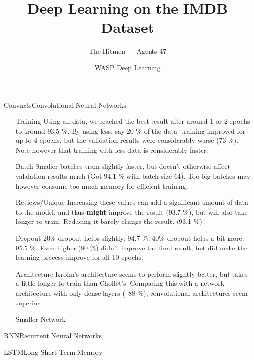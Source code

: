 \documentclass{beamer}
\title{Deep Learning on the IMDB Dataset}
\date{WASP Deep Learning}
\author[Agents 47]{The Hitmen --- Agents 47}
\begin{document}
\begin{frame}
  \titlepage
\end{frame}


\begin{frame}{Convnets}{Convolutional Neural Networks}

\begin{itemize}

\item[Training] Using all data, we reached the best result after around 1 or 2
  epochs to around 93.5 \%. By using less, say 20 \% of the data, training
  improved for up to 4 epochs, but the validation results were considerably
  worse (73 \%). Note however that training with less data is considerably
  faster.
  
\item[Batch] Smaller batches train slightly faster, but doesn't otherwise
  affect validation results much (Got 94.1 \% with batch size 64). Too big
  batches may however consume too much memory for efficient training.

\item[Reviews/Unique] Increasing these values can add a significant amount of
  data to the model, and thus \textbf{might} improve the result (93.7 \%), but
  will also take longer to train. Reducing it barely changs the result. (93.1
  \%).
 
\item[Dropout] 20\% dropout helps slightly: 94.7 \%.  40\% dropout helps a bit
  more: 95.5 \%. Even higher (80 \%) didn't improve the final result, but did
  make the learning process improve for all 10 epochs.

\item[Architecture] Krohn's architecture seems to perform slightly better, but
  takes a little longer to train than Chollet's. Comparing this with a network
  architecture with only dense layers (~88 \%), convolutional architectures seem
  superior.

\item[Smaller Network]
  
\end{itemize}

\end{frame}


\begin{frame}{RNN}{Recurrent Neural Networks}
  
\end{frame}

\begin{frame}{LSTM}{Long Short Term Memory}
  
\end{frame}
\end{document}
